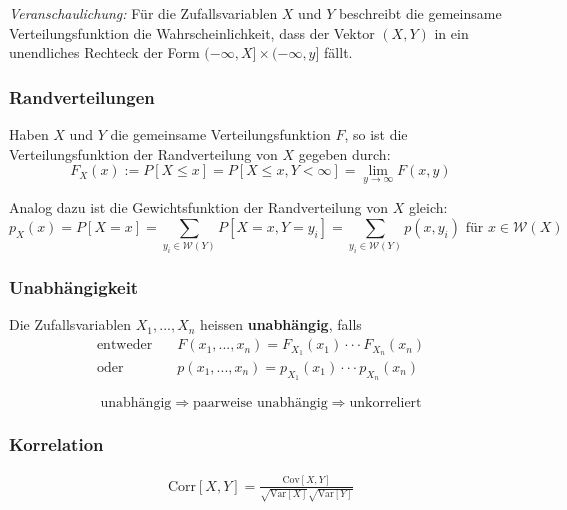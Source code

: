 \documentclass[11pt]{article}
\newcommand{\Var}{\text{Var}}
\newcommand{\Cov}{\text{Cov}}
\begin{document}
\emph{Veranschaulichung:} F{\"u}r die Zufallsvariablen $X$ und $Y$ beschreibt die gemeinsame Verteilungsfunktion die Wahrscheinlichkeit, dass der Vektor $(X,Y)$ in ein unendliches Rechteck der Form $(-\infty, X] \times (-\infty,y]$ f{\"a}llt.

\subsubsection{Randverteilungen}

Haben $X$ und $Y$ die gemeinsame Verteilungsfunktion $F$, so ist die Verteilungsfunktion der Randverteilung von $X$ gegeben durch:
\begin{equation*}
	F_X(x) := P[X \leq x] = P[X \leq x, Y < \infty] = \lim_{y \rightarrow \infty} F(x,y)
\end{equation*}

Analog dazu ist die Gewichtsfunktion der Randverteilung von $X$ gleich:
\begin{equation*}
	p_X(x) = P[X = x] = \sum_{y_i \in \mathcal{W}(Y)} P[X=x, Y=y_i] = \sum_{y_i \in \mathcal{W}(Y)} p(x, y_i) \text{ f{\"u}r } x \in \mathcal{W}(X)
\end{equation*}

\subsubsection{Unabh{\"a}ngigkeit}

Die Zufallsvariablen $X_1,...,X_n$ heissen \textbf{unabh{\"a}ngig}, falls
\begin{equation*}
\begin{split}
		\text{entweder} \quad & F(x_1,...,x_n) = F_{X_1}(x_1) \cdot\cdot\cdot F_{X_n}(x_n)  \\
		\text{oder} \quad & p(x_1,...,x_n) = p_{X_1}(x_1) \cdot\cdot\cdot p_{X_n}(x_n)
\end{split}
\end{equation*}

\begin{equation*}
	\text{unabh{\"a}ngig} \Rightarrow \text{paarweise unabh{\"a}ngig} \Rightarrow \text{unkorreliert}
\end{equation*}

\subsubsection{Korrelation}
\begin{equation*}
	\begin{split}
		\text{Corr}[X,Y]=\frac{\Cov[X,Y]}{\sqrt{\Var[X]}\sqrt{\Var[Y]}}
	\end{split}
\end{equation*}
\end{document}
